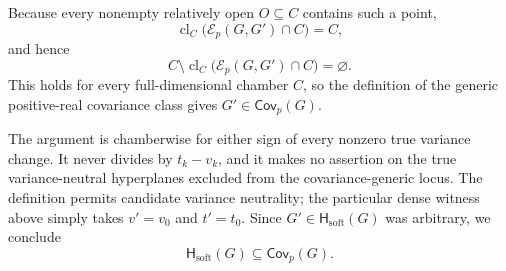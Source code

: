 Because every nonempty relatively open \(O\subseteq C\) contains such a point,
\[
 \operatorname{cl}_{C}\bigl(\mathcal E_p(G,G')\cap C\bigr)=C,
\]
and hence
\[
 C\setminus\operatorname{cl}_{C}\bigl(\mathcal E_p(G,G')\cap C\bigr)=\varnothing.
\]
This holds for every full-dimensional chamber \(C\), so the definition of the generic positive-real covariance class gives \(G'\in\mathsf{Cov}_p(G)\).

The argument is chamberwise for either sign of every nonzero true variance change.  It never divides by \(t_k-v_k\), and it makes no assertion on the true variance-neutral hyperplanes excluded from the covariance-generic locus.  The definition permits candidate variance neutrality; the particular dense witness above simply takes \(v'=v_0\) and \(t'=t_0\).  Since \(G'\in\mathsf H_{\mathrm{soft}}(G)\) was arbitrary, we conclude
\[
 \mathsf H_{\mathrm{soft}}(G)\subseteq\mathsf{Cov}_p(G).
\]
